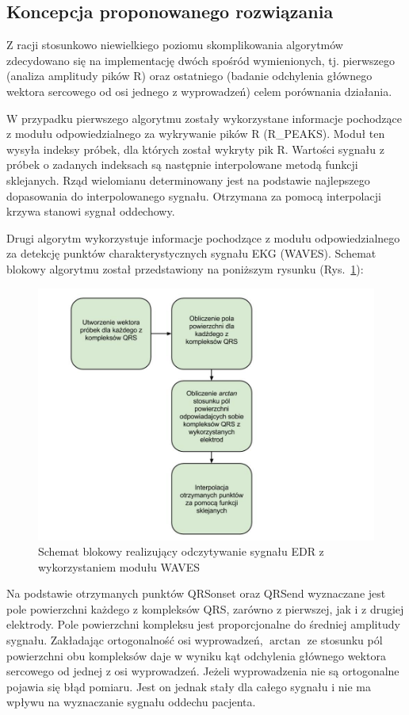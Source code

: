  
\subsection{Koncepcja proponowanego rozwiązania}
 
		Z racji stosunkowo niewielkiego poziomu skomplikowania algorytmów zdecydowano się na implementację dwóch spośród wymienionych, tj. pierwszego (analiza amplitudy pików R) oraz ostatniego (badanie odchylenia głównego wektora sercowego od osi jednego z wyprowadzeń) celem porównania działania.
	   
		W przypadku pierwszego algorytmu zostały wykorzystane informacje pochodzące z modułu odpowiedzialnego za wykrywanie pików R (R\_PEAKS). Moduł ten wysyła indeksy próbek, dla których został wykryty pik R. Wartości sygnału z próbek o zadanych indeksach są następnie  interpolowane metodą funkcji sklejanych. Rząd wielomianu determinowany jest na podstawie najlepszego dopasowania do interpolowanego sygnału.   Otrzymana za pomocą interpolacji krzywa stanowi sygnał oddechowy.
 
		Drugi algorytm wykorzystuje informacje pochodzące z modułu odpowiedzialnego za detekcję punktów charakterystycznych sygnału EKG (WAVES). Schemat blokowy algorytmu został przedstawiony na poniższym rysunku (Rys.~\ref{fig:graf}):
	   
\begin{figure}[ht]
\centering
\includegraphics[width=12cm]{SIG_EDR/img/graf.jpg}
\caption{Schemat blokowy realizujący odczytywanie sygnału EDR z wykorzystaniem modułu WAVES}
\label{fig:graf}
\end{figure}   
	   
		 Na podstawie otrzymanych punktów QRSonset oraz QRSend wyznaczane jest pole powierzchni każdego z kompleksów QRS, zarówno z pierwszej, jak i z drugiej elektrody. Pole powierzchni kompleksu jest proporcjonalne do średniej amplitudy sygnału. Zakładając ortogonalność osi wyprowadzeń, $\arctan$ ze stosunku pól powierzchni obu kompleksów daje w wyniku kąt odchylenia głównego wektora sercowego od jednej z osi wyprowadzeń. Jeżeli wyprowadzenia nie są ortogonalne pojawia się błąd pomiaru. Jest on jednak stały dla całego sygnału i nie ma wpływu na wyznaczanie sygnału oddechu pacjenta.
 

